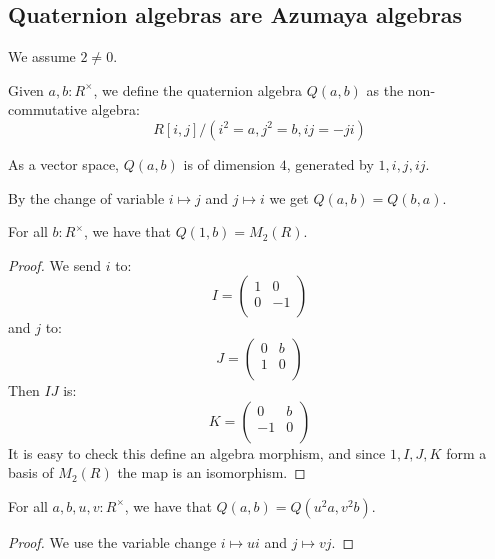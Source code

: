 \subsection{Quaternion algebras are Azumaya algebras}

We assume $2\not=0$.

\begin{definition}
Given $a,b:R^\times$, we define the quaternion algebra $Q(a,b)$ as the non-commutative algebra:
\[R[i,j]/(i^2=a,j^2=b,ij=-ji)\] 
\end{definition}

\begin{remark}
As a vector space, $Q(a,b)$ is of dimension $4$, generated by $1,i,j,ij$.
\end{remark}

\begin{remark}
By the change of variable $i\mapsto j$ and $j\mapsto i$ we get $Q(a,b) = Q(b,a)$.
\end{remark}

\begin{lemma}\label{quaternion-split}
For all $b:R^\times$, we have that $Q(1,b) = M_2(R)$.
\end{lemma}

\begin{proof}
We send $i$ to:
\[I = \begin{pmatrix}
1 & 0\\
0 & -1\\
\end{pmatrix}\]
and $j$ to:
\[J = \begin{pmatrix}
0 & b\\
1 & 0\\
\end{pmatrix}\]
Then $IJ$ is:
\[K = \begin{pmatrix}
0 & b\\
-1 & 0\\
\end{pmatrix}\]
It is easy to check this define an algebra morphism, and since $1,I,J,K$ form a basis of $M_2(R)$ the map is an isomorphism.
\end{proof}

\begin{lemma}\label{quaternion-change-variable}
For all $a,b,u,v:R^\times$, we have that $Q(a,b) = Q(u^2a,v^2b)$.
\end{lemma}

\begin{proof}
We use the variable change $i\mapsto ui$ and $j\mapsto vj$.
\end{proof}

